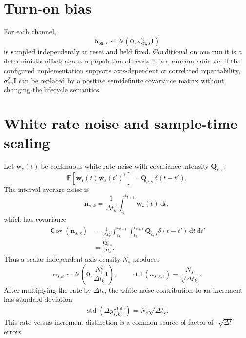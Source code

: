 \documentclass[11pt,oneside,headings=big]{scrreprt}
\newcommand{\Normal}{\mathcal{N}}
\newcommand{\E}{\mathbb{E}}
\newcommand{\Cov}{\operatorname{Cov}}
\newcommand{\dd}{\,\mathrm{d}}
\newcommand{\transpose}{\mathsf{T}}
\newcommand{\vect}[1]{\bm{#1}}
\newcommand{\mat}[1]{\bm{#1}}
\begin{document}
    \section{Turn-on bias}
    For each channel,
    \begin{equation}
        \vect b_{\mathrm{on},s}\sim
        \Normal(\vect0,\sigma_{\mathrm{on},s}^{2}\mat I)
        \label{eq:turn-on-bias}
    \end{equation}
    is sampled independently at reset and held fixed. Conditional on one run it is
    a deterministic offset; across a population of resets it is a random variable.
    If the configured implementation supports axis-dependent or correlated
    repeatability, \(\sigma_{\mathrm{on}}^2\mat I\) can be replaced by a positive
    semidefinite covariance matrix without changing the lifecycle semantics.


    \section{White rate noise and sample-time scaling}
    Let \(\vect w_s(t)\) be continuous white rate noise with covariance intensity
    \(\mat Q_{c,s}\):
    \begin{equation}
        \E\!\left[\vect w_s(t)\vect w_s(t')^\transpose\right]
        =\mat Q_{c,s}\,\delta(t-t').
        \label{eq:white-continuous}
    \end{equation}
    The interval-average noise is
    \begin{equation}
        \vect n_{s,k}
        =\frac{1}{\Delta t_k}\int_{t_k}^{t_{k+1}}\vect w_s(t)\dd t,
    \end{equation}
    which has covariance
    \begin{align}
        \Cov(\vect n_{s,k})
        &=\frac{1}{\Delta t_k^2}
        \int_{t_k}^{t_{k+1}}\!\int_{t_k}^{t_{k+1}}
        \mat Q_{c,s}\delta(t-t')\dd t\dd t'\\
        &=\frac{\mat Q_{c,s}}{\Delta t_k}.
        \label{eq:white-discrete-cov}
    \end{align}
    Thus a scalar independent-axis density \(N_s\) produces
    \begin{equation}
        \vect n_{s,k}\sim
        \Normal\!\left(\vect0,\frac{N_s^2}{\Delta t_k}\mat I\right),
        \qquad
        \operatorname{std}(n_{s,k,i})=\frac{N_s}{\sqrt{\Delta t_k}}.
        \label{eq:white-density}
    \end{equation}
    After multiplying the rate by \(\Delta t_k\), the white-noise contribution to an
    increment has standard deviation
    \begin{equation}
        \operatorname{std}(\Delta y^{\mathrm{white}}_{s,k,i})
        =N_s\sqrt{\Delta t_k}.
        \label{eq:increment-noise-scaling}
    \end{equation}
    This rate-versus-increment distinction is a common source of factor-of-
    \(\sqrt{\Delta t}\) errors.
\end{document}
